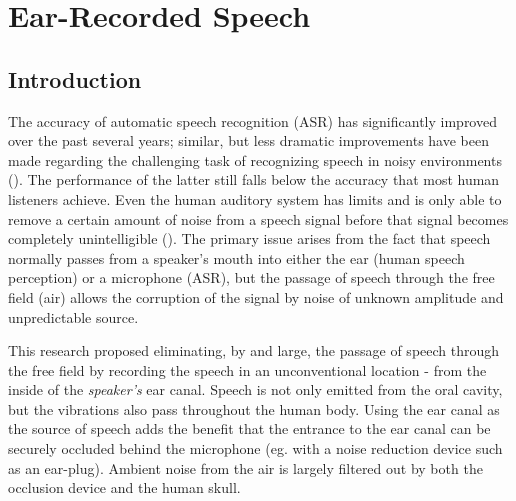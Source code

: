 % 
% 
% 



\chapter{Ear-Recorded Speech\label{chapter2}}


\section{Introduction}

The accuracy of automatic speech recognition (ASR) has significantly improved over the past several years; similar, but less dramatic improvements have been made regarding the challenging task of recognizing speech in noisy environments (\cite{zhang:17}).  The performance of the latter still falls below the accuracy that most human listeners achieve.  Even the human auditory system has limits and is only able to remove a certain amount of noise from a speech signal before that signal becomes completely unintelligible (\cite{gilbert:13}).  The primary issue arises from the fact that speech normally passes from a speaker's mouth into either the ear (human speech perception) or a microphone (ASR), but the passage of speech through the free field (air) allows the corruption of the signal by noise of unknown amplitude and unpredictable source.  

This research proposed eliminating, by and large, the passage of speech through the free field by recording the speech in an unconventional location - from the inside of the \textit{speaker's} ear canal.  Speech is not only emitted from the oral cavity, but the vibrations also pass throughout the human body.  Using the ear canal as the source of speech adds the benefit that the entrance to the ear canal can be securely occluded behind the microphone (eg. with a noise reduction device such as an ear-plug).  Ambient noise from the air is largely filtered out by both the occlusion device and the human skull.

